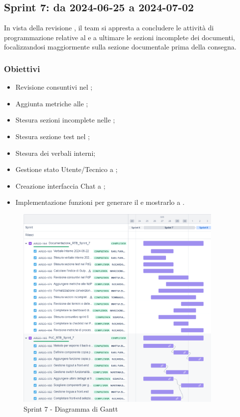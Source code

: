 \subsection{Sprint 7: da 2024-06-25 a 2024-07-02}
\par In vista della revisione , il team si appresta a concludere le attività di programmazione relative al  e a ultimare le sezioni incomplete dei documenti, focalizzandosi maggiormente sulla sezione documentale prima della consegna.

\subsubsection{Obiettivi}
\begin{itemize}
  \item Revisione consuntivi nel \PdP;
  \item Aggiunta metriche alle \NdP;
  \item Stesura sezioni incomplete nelle \NdP;
  \item Stesura sezione test nel \PdQ;
  \item Stesura dei verbali interni;
  \item Gestione stato Utente/Tecnico a ;
  \item Creazione interfaccia Chat a ;
  \item Implementazione funzioni per generare il  e mostrarlo a .
\end{itemize}

\begin{figure}[H]
  \centering
  \includegraphics[width=0.90\textwidth]{assets/Pianificazione/Sprint-7/gantt.png}
  \caption{Sprint 7 - Diagramma di Gantt}\label{fig:sprint-7-gantt}
\end{figure}